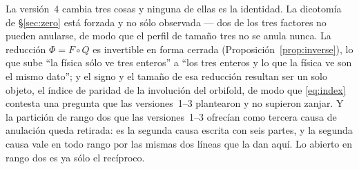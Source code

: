 \documentclass[11pt,a4paper]{article}
\begin{document}
La versi\'on~4 cambia tres cosas y ninguna de ellas es la identidad. La dicotom\'ia de
\S\ref{sec:zero} est\'a forzada y no s\'olo observada --- dos de los tres factores no pueden
anularse, de modo que el perfil de tama\~no tres no se anula nunca. La reducci\'on $\Phi=F\circ Q$
es invertible en forma cerrada (Proposici\'on~\ref{prop:inverse}), lo que sube ``la f\'isica
s\'olo ve tres enteros'' a ``los tres
enteros y lo que la f\'isica ve son el mismo dato''; y el signo y el tama\~no de esa reducci\'on
resultan ser un solo objeto, el \'indice de paridad de la involuci\'on del orbifold, de modo que
\eqref{eq:index} contesta una pregunta que las versiones~1--3 plantearon y no supieron zanjar.
Y la partici\'on de rango dos que las
versiones~1--3 ofrec\'ian como tercera causa de anulaci\'on queda retirada: es la segunda causa
escrita con seis partes, y la segunda causa vale en todo rango por las mismas dos l\'ineas que la
dan aqu\'i. Lo abierto en rango dos es ya s\'olo el rec\'iproco.
\end{document}
